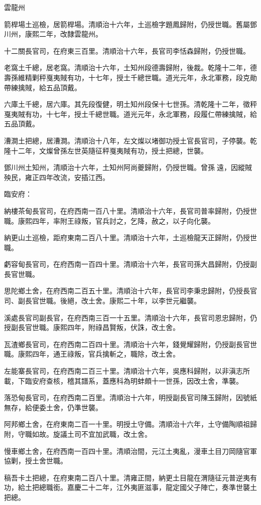 \begin{pinyinscope}
雲龍州

箭桿場土巡檢，居箭桿場。清順治十六年，土巡檢字題鳳歸附，仍授世職。舊屬鄧川州，康熙二年，改隸雲龍州。

十二關長官司，在府東三百里。清順治十六年，長官司李恬森歸附，仍授世職。

老窩土千總，居老窩。清順治十六年，土知州段德壽歸附，後裁。乾隆十二年，德壽孫維精剿秤戛夷賊有功，十七年，授土千總世職。道光元年，永北軍務，段克勛帶練擒賊，給五品頂戴。

六庫土千總，居六庫。其先段復健，明土知州段保十七世孫。清乾隆十二年，徵秤戛夷賊有功，十七年，授土千總世職。道光元年，永北軍務，段履仁帶練擒賊，給五品頂戴。

漕澗土把總，居漕澗。清順治十八年，左文燦以堵御功授土官長官司，子停襲。乾隆十二年，文燦曾孫左世英隨征秤戛夷賊有功，授土把總，世襲。

鄧川州土知州，清順治十六年，土知州阿尚夔歸附，仍授世職。曾孫遠，因縱賊殃民，雍正四年改流，安插江西。

臨安府：

納樓茶甸長官司，在府西南一百八十里。清順治十六年，長官司普率歸附，仍授世職。康熙四年，率附王祿叛，官兵討之，乞降，赦之，以子向化襲。

納更山土巡檢，距府東南二百八十里。清順治十六年，土巡檢龍天正歸附，仍授世職。

虧容甸長官司，在府西南一百四十里。清順治十六年，長官司孫大昌歸附，仍授副長官世職。

思陀鄉土舍，在府西南二百五十里。清順治十六年，長官司李秉忠歸附，仍授長官司、副長官世職。後絕，改土舍。康熙二十年，以李世元繼襲。

溪處長官司副長官，在府西南三百一十五里。清順治十六年，長官司恩忠歸附，仍授副長官世職。康熙四年，附祿昌賢叛，伏誅，改土舍。

瓦渣鄉長官司，在府西南二百四十里。清順治十六年，錢覺耀歸附，仍授副長官世職。康熙四年，通王祿叛，官兵擒斬之，職除，改土舍。

左能寨長官司，在府西南二百三十里。清順治十六年，吳應科歸附，以非滇志所載，下臨安府查核，稽其譜系，蓋應科為明蚌頗十一世孫，因改土舍，準襲。

落恐甸長官司，在府西南二百里。清順治十六年，明授副長官司陳玉歸附，因號紙無存，給便委土舍，仍準世襲。

阿邦鄉土舍，在府東南二百一十里。明授土守備。清順治十六年，土守備陶順祖歸附，守職如故。旋議土司不宜加武職，改土舍。

慢車鄉土舍，在府西南一百四十里。清順治間，元江土夷亂，漫車土目刀岡隨官軍協剿，授土舍世職。

稿吾卡土把總，在府東南二百八十里。清雍正間，納更土目龍在渭隨征元普逆夷有功，給土把總職銜。嘉慶二十二年，江外夷匪滋事，龍定國父子陣亡，奏準世襲土把總。


\end{pinyinscope}
